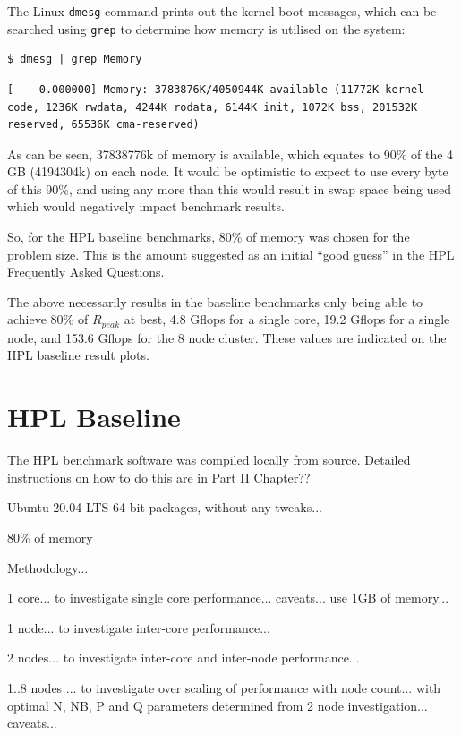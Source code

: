 \documentclass{report}
\begin{document}
The Linux \verb|dmesg| command prints out the kernel boot messages, which can be searched using \verb|grep| to determine how memory is utilised on the system:

\lstset{style=type}
\begin{lstlisting}
$ dmesg | grep Memory
\end{lstlisting}

\lstset{style=type}
\begin{lstlisting}
[    0.000000] Memory: 3783876K/4050944K available (11772K kernel code, 1236K rwdata, 4244K rodata, 6144K init, 1072K bss, 201532K reserved, 65536K cma-reserved)
\end{lstlisting}

As can be seen, 37838776k of memory is available, which equates to 90\% of the 4 GB (4194304k) on each node. It would be optimistic to expect to use every byte of this 90\%, and using any more than this would result in swap space being used which would negatively impact benchmark results.

So, for the HPL baseline benchmarks, 80\% of memory was chosen for the problem size. This is the amount suggested as an initial ``good guess'' in the HPL Frequently Asked Questions.

The above necessarily results in the baseline benchmarks only being able to achieve 80\% of $R_{peak}$ at best, 4.8 Gflops for a single core, 19.2 Gflops for a single node, and 153.6 Gflops for the 8 node cluster. These values are indicated on the HPL baseline result plots.


%
%
\section{HPL Baseline}

The HPL benchmark software was compiled locally from source. Detailed instructions on how to do this are in Part II Chapter??

Ubuntu 20.04 LTS 64-bit packages, without any tweaks...

80\% of memory

Methodology...

1 core... to investigate single core performance... caveats... use 1GB of memory...

1 node... to investigate inter-core performance...

2 nodes... to investigate inter-core and inter-node performance...

1..8 nodes ... to investigate over scaling of performance with node count... with optimal N, NB, P and Q parameters determined from 2 node investigation... caveats...
\end{document}

